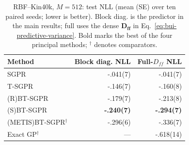 \begin{table}[!ht]
\caption{RBF--Kin40k, $M=512$: test NLL (mean (SE) over ten paired seeds; lower is better). Block diag. is the predictor in the main results; full uses the dense $\mathbf D_{\mathbf{ff}}$ in Eq.~\eqref{eq:bui-predictive-variance}. Bold marks the best of the four principal methods; $^\dagger$ denotes comparators.}
\label{tab:kin40k-sgpr-real-nll}
\centering\footnotesize
\setlength{\tabcolsep}{3pt}
\begin{tabular}{@{}lrr@{}}
\toprule
Method & Block diag. NLL & Full-$D_{ff}$ NLL \\
\midrule
SGPR & -.041(7) & -.041(7) \\
T-SGPR & -.146(7) & -.160(8) \\
(R)BT-SGPR & -.179(7) & -.213(8) \\
(S)BT-SGPR & \textbf{-.240(7)} & \textbf{-.294(7)} \\
\midrule
(METIS)BT-SGPR$^{\dagger}$ & -.296(6) & -.336(7) \\
\midrule
Exact GP$^{\dagger}$ & --- & -.618(14) \\
\bottomrule
\end{tabular}
\end{table}
